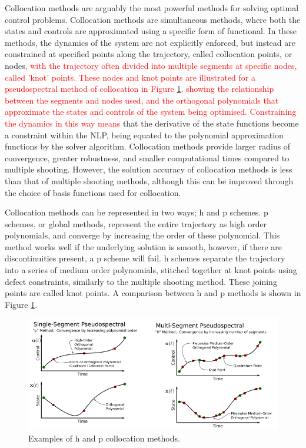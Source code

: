 Collocation methods are arguably the most powerful methods for solving optimal control problems\cite{Rao2009}. Collocation methods are simultaneous methods, where both the states and controls are approximated using a specific form of functional\cite{Kelly2015,Rao2009}. In these methods, the dynamics of the system are not explicitly enforced, but instead are constrained at specified points along the trajectory, called collocation points, or nodes\cite{Kelly2015}\textcolor{red}{, with the trajectory often divided into multiple segments at specific nodes, called 'knot' points. These nodes and knot points are illustrated for a pseudospectral method of collocation in Figure \ref{fig:HPExamples}, showing the relationship between the segments and nodes used, and the orthogonal polynomials that approximate the states and controls of the system being optimised. Constraining the dynamics in this way means} that the derivative of the state functions become a constraint within the NLP, being equated to the polynomial approximation functions by the solver algorithm. 
Collocation methods provide larger radius of convergence, greater robustness, and smaller computational times compared to multiple shooting\cite{Fasano2013}. However, the solution accuracy of collocation methods is less than that of multiple shooting methods\cite{Fasano2013}, although this can be improved through the choice of basis functions used for collocation\cite{Rao2009}.

Collocation methods can be represented in two ways; \textsf{h} and \textsf{p} schemes\cite{Kelly2015}. \textsf{p} schemes, or global methods, represent the entire trajectory as high order polynomials, and converge by increasing the order of these polynomial\cite{Kelly2015}. This method works well if the underlying solution is smooth, however, if there are discontinuities present, a \textsf{p} scheme will fail\cite{Kelly2015}. \textsf{h} schemes separate the trajectory into a series of medium order polynomials, stitched together at knot points using defect constraints, similarly to the multiple shooting method\cite{Kelly2015,Rao2009,Ross2004}. These joining points are called knot points\cite{Kelly2015,Ross2004}. A comparison between \textsf{h} and \textsf{p} methods is shown in Figure \ref{fig:HPExamples}.

\begin{figure}[ht]
	\centering
	\includegraphics[width=0.9\linewidth]{figures/2_literature-review/HPExamples}
	\caption{Examples of \textsf{h} and \textsf{p} collocation methods\cite{Kelly2015}.}
	\label{fig:HPExamples}
\end{figure}

